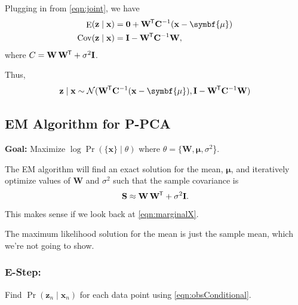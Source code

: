 \documentclass[11pt]{article}
\DeclareMathOperator{\E}{E}
\DeclareMathOperator{\Cov}{Cov}
\newcommand{\xb}{\mathbf{x}}
\newcommand{\zb}{\mathbf{z}}
\newcommand{\ub}{\symbf{\mu}}
\newcommand{\Wb}{\mathbf{W}}
\newcommand*{\tran}{^{\mkern-1.5mu\mathsf{T}}}
\begin{document}
Plugging in from \eqref{eqn:joint}, we have
\begin{align*}
  \E(\zb \mid \xb) &= \mathbf{0} + \Wb\tran \mathbf{C}^{-1}(\xb-\ub) \\
  \Cov(\zb \mid \xb) &= \mathbf{I} - \Wb\tran \mathbf{C}^{-1} \Wb,
\end{align*}
where $C = \Wb \, \Wb\tran + \sigma^2 \mathbf{I}$.

Thus,
\begin{equation}
  \zb \mid \xb \sim \mathcal{N} (\Wb\tran \mathbf{C}^{-1} (\xb-\ub),
      \mathbf{I} - \Wb\tran \mathbf{C}^{-1}\Wb)
  \label{eqn:obsConditional}
\end{equation}

\subsection{EM Algorithm for P-PCA}
\begin{center}
  \textbf{Goal:} Maximize $\log \Pr(\{\xb\} \mid \theta)$ where
    $\theta = \{\Wb, \ub, \sigma^2$\}.
\end{center}
The EM algorithm will find an exact solution for the mean, $\ub$,
and iteratively optimize values of $\Wb$ and $\sigma^2$ such that the
sample covariance is
\begin{equation*}
  \mathbf{S} \approx \Wb\,\Wb\tran + \sigma^2 \mathbf{I}.
\end{equation*}
This makes sense if we look back at \eqref{eqn:marginalX}.

The maximum likelihood solution for the mean is just the sample mean, which
we're not going to show.

\subsubsection*{E-Step:}
Find $\Pr(\zb_n \mid \xb_n)$ for each data point using \eqref{eqn:obsConditional}.
\end{document}
